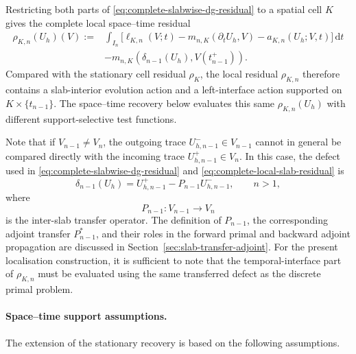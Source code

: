 Restricting both parts of \eqref{eq:complete-slabwise-dg-residual} to a spatial cell \(K\) gives the complete local space--time residual
\begin{equation}
  \begin{aligned}
  \rho_{K,n}(U_h)(V)
  :={}&
  \int_{I_n}
  \Big[
    \ell_{K,n}(V;t)
    -
    m_{n,K}(\partial_tU_h,V)
    -
    a_{K,n}(U_h;V,t)
  \Big]\,\mathrm dt
  \\
  &-
  m_{n,K}\!\left(
    \delta_{n-1}(U_h),
    V(t_{n-1}^{+})
  \right).
  \end{aligned}
  \label{eq:complete-local-slab-residual}
\end{equation}
Compared with the stationary cell residual \(\rho_K\), the local residual \(\rho_{K,n}\) therefore contains a slab-interior evolution action and a left-interface action supported on \(K\times\{t_{n-1}\}\). The space--time recovery below evaluates this same \(\rho_{K,n}(U_h)\) with different support-selective test functions.

Note that if \(V_{n-1}\neq V_n\), the outgoing trace \(U_{h,n-1}^{-}\in V_{n-1}\) cannot in general be compared directly with the incoming trace \(U_{h,n-1}^{+}\in V_n\). In this case, the defect used in \eqref{eq:complete-slabwise-dg-residual} and \eqref{eq:complete-local-slab-residual} is
\begin{equation}
  \delta_{n-1}(U_h)
  =
  U_{h,n-1}^{+}
  -
  P_{n-1}U_{h,n-1}^{-},
  \qquad n>1,
  \label{eq:transferred-dg-time-defect}
\end{equation}
where
\begin{equation}
  P_{n-1}:V_{n-1}\longrightarrow V_n
\end{equation}
is the inter-slab transfer operator. The definition of \(P_{n-1}\), the corresponding adjoint transfer \(P_{n-1}^{\ast}\), and their roles in the forward primal and backward adjoint propagation are discussed in Section~\ref{sec:slab-transfer-adjoint}. For the present localisation construction, it is sufficient to note that the temporal-interface part of \(\rho_{K,n}\) must be evaluated using the same transferred defect as the discrete primal problem.


\paragraph{Space--time support assumptions.}
The extension of the stationary recovery is based on the following assumptions.

